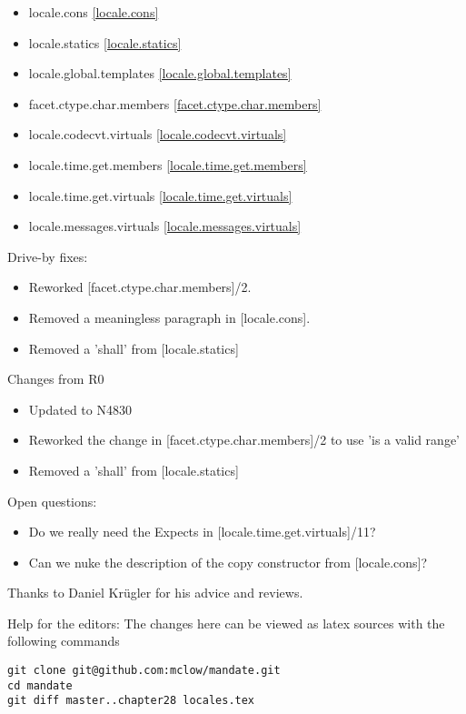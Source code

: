 \begin{multicols}{2}
\begin{itemize}
\item{locale.cons}					\ref{locale.cons}
\item{locale.statics}				\ref{locale.statics}
\item{locale.global.templates}		\ref{locale.global.templates}
\item{facet.ctype.char.members}		\ref{facet.ctype.char.members}
\item{locale.codecvt.virtuals}		\ref{locale.codecvt.virtuals}
\item{locale.time.get.members}		\ref{locale.time.get.members}
\item{locale.time.get.virtuals}		\ref{locale.time.get.virtuals}
\item{locale.messages.virtuals}		\ref{locale.messages.virtuals}
\end{itemize}
\end{multicols}

Drive-by fixes:
\begin{itemize}
\item{Reworked [facet.ctype.char.members]/2.}
\item{Removed a meaningless paragraph in [locale.cons].}
\item{Removed a 'shall' from [locale.statics]}
\end{itemize}

Changes from R0
\begin{itemize}
\item{Updated to N4830}
\item{Reworked the change in [facet.ctype.char.members]/2 to use 'is a valid range'}
\item{Removed a 'shall' from [locale.statics]}
\end{itemize}

Open questions:
\begin{itemize}
\item{Do we really need the Expects in [locale.time.get.virtuals]/11?}
\item{Can we nuke the description of the copy constructor from [locale.cons]?}
\end{itemize}


Thanks to Daniel Krügler for his advice and reviews.

\vfill
Help for the editors: The changes here can be viewed as latex sources with the following commands
\begin{verbatim}
git clone git@github.com:mclow/mandate.git
cd mandate
git diff master..chapter28 locales.tex
\end{verbatim}


